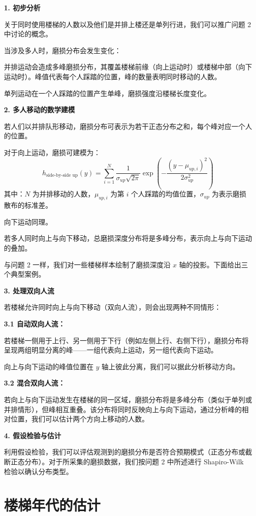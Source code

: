 \documentclass[11pt,a4paper]{ctexart}
\newcommand{\runin}[1]{\par\noindent\textbf{#1}\par\nobreak}
\begin{document}
\runin{1. 初步分析}

关于同时使用楼梯的人数以及他们是并排上楼还是单列行进，我们可以推广问题 2 中讨论的概念。

当涉及多人时，磨损分布会发生变化：

并排运动会造成多峰磨损分布，其覆盖楼梯前缘（向上运动时）或楼梯中部（向下运动时）。峰值代表每个人踩踏的位置，峰的数量表明同时移动的人数。

单列运动在一个人踩踏的位置产生单峰，磨损强度沿楼梯长度变化。

\runin{2. 多人移动的数学建模}

若人们以并排队形移动，磨损分布可表示为若干正态分布之和，每个峰对应一个人的位置。

对于向上运动，磨损可建模为：
\begin{equation}
h_{\text{side-by-side up}}(y)=\sum_{i=1}^{N}\frac{1}{\sigma_{up}\sqrt{2\pi}}\exp\left(-\frac{(y-\mu_{up,i})^2}{2\sigma_{up}^2}\right) \tag{21}
\end{equation}
其中：$N$ 为并排移动的人数，$\mu_{up,i}$ 为第 $i$ 个人踩踏的均值位置，$\sigma_{up}$ 为表示磨损散布的标准差。

向下运动同理。

若多人同时向上与向下移动，总磨损深度分布将是多峰分布，表示向上与向下运动的叠加。

与问题 2 一样，我们对一些楼梯样本绘制了磨损深度沿 $x$ 轴的投影。下面给出三个典型案例。

\runin{3. 处理双向人流}

若楼梯允许同时向上与向下移动（双向人流），则会出现两种不同情形：

\runin{3.1 自动双向人流：}

若楼梯一侧用于上行、另一侧用于下行（例如左侧上行、右侧下行），磨损分布将呈现两组明显分离的峰——一组代表向上运动，另一组代表向下运动。

向上与向下运动的峰值位置在 $y$ 轴上彼此分离，我们可以据此分析移动方向。

\runin{3.2 混合双向人流：}

若向上与向下运动发生在楼梯的同一区域，磨损分布将是多峰分布（类似于单列或并排情形），但峰相互重叠。该分布将同时反映向上与向下运动，通过分析峰的相对位置，我们可以估计两个方向上移动的人数。

\runin{4. 假设检验与估计}

利用假设检验，我们可以评估观测到的磨损分布是否符合预期模式（正态分布或截断正态分布）。对于所采集的磨损数据，我们按问题 2 中所述进行 Shapiro-Wilk 检验以确认分布类型。

\section{楼梯年代的估计}
\end{document}
